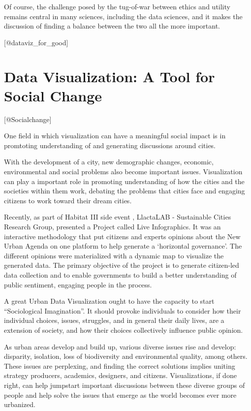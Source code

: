 \documentclass[]{book}
\theoremstyle{definition}
\theoremstyle{definition}
\theoremstyle{definition}
\theoremstyle{remark}
\begin{document}
Of course, the challenge posed by the tug-of-war between ethics and
utility remains central in many sciences, including the data sciences,
and it makes the discussion of finding a balance between the two all the
more important.

{[}@dataviz\_for\_good{]}

\section{Data Visualization: A Tool for Social
Change}\label{data-visualization-a-tool-for-social-change}

{[}@Socialchange{]}

One field in which visualization can have a meaningful social impact is
in promtoting understanding of and generating discussions around cities.

With the development of a city, new demographic changes, economic,
environmental and social problems also become important issues.
Visualization can play a important role in promoting understanding of
how the cities and the societies within them work, debating the problems
that cities face and engaging citizens to work toward their dream
cities.

Recently, as part of Habitat III side event , LlactaLAB - Sustainable
Cities Research Group, presented a Project called Live Infographics. It
was an interactive methodology that put citizens and experts opinions
about the New Urban Agenda on one platform to help generate a
`horizontal governance'. The different opinions were materialized with a
dynamic map to visualize the generated data. The primary objective of
the project is to generate citizen-led data collection and to enable
governments to build a better understanding of public sentiment,
engaging people in the process.

A great Urban Data Visualization ought to have the capacity to start
``Sociological Imagination''. It should provoke individuals to consider
how their individual choices, issues, struggles, and in general their
daily lives, are a extension of society, and how their choices
collectively influence public opinion.

As urban areas develop and build up, various diverse issues rise and
develop: disparity, isolation, loss of biodiversity and environmental
quality, among others. These issues are perplexing, and finding the
correct solutions implies uniting strategy producers, academics,
designers, and citizens. Visualizations, if done right, can help
jumpstart important discussions between these diverse groups of people
and help solve the issues that emerge as the world becomes ever more
urbanized.
\end{document}
